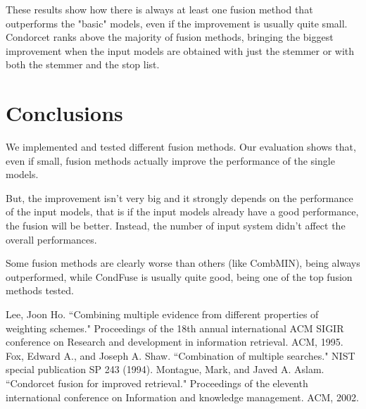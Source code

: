 	These results show how there is always at least one fusion method that outperforms the "basic" models, even if the improvement is usually quite small.
	Condorcet ranks above the majority of fusion methods, bringing the biggest improvement when the input models are obtained with just the stemmer or with both the stemmer and the stop list.	
	
	\section{Conclusions}
	We implemented and tested different fusion methods. Our evaluation shows that, even if small, fusion methods actually improve the performance of the single models.
	
	But, the improvement isn't very big and it strongly depends on the performance of the input models, that is if the input models already have a good performance, the fusion will be better. Instead, the number of input system didn't affect the overall performances.
	
	Some fusion methods are clearly worse than others (like CombMIN), being always outperformed, while CondFuse is usually quite good, being one of the top fusion methods tested.

	\begin{thebibliography}{1}
		Lee, Joon Ho. ``Combining multiple evidence from different properties of weighting schemes." Proceedings of the 18th annual international ACM SIGIR conference on Research and development in information retrieval. ACM, 1995.
		Fox, Edward A., and Joseph A. Shaw. ``Combination of multiple searches." NIST special publication SP 243 (1994).
		Montague, Mark, and Javed A. Aslam. ``Condorcet fusion for improved retrieval." Proceedings of the eleventh international conference on Information and knowledge management. ACM, 2002.
		
	\end{thebibliography}
	


